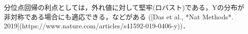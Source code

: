 分位点回帰の利点としては，外れ値に対して堅牢(ロバスト)である，Yの分布が非対称である場合にも適応できる，などがある ([Das et al., *Nat Methods*. 2019](https://www.nature.com/articles/s41592-019-0406-y))．
